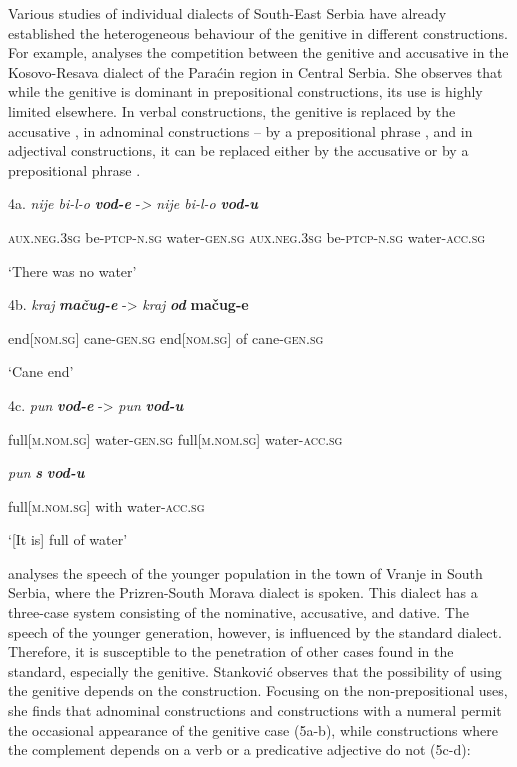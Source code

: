 \documentclass[output=paper]{langscibook}
\begin{document}
Various studies of individual dialects of South-East Serbia have already established the heterogeneous behaviour of the genitive in different constructions. For example, \citet{Miloradović2003} analyses the competition between the genitive and accusative in the Kosovo-Resava dialect of the Paraćin region in Central Serbia. She observes that while the genitive is dominant in prepositional constructions, its use is highly limited elsewhere. In verbal constructions, the genitive is replaced by the accusative , in adnominal constructions – by a prepositional phrase , and in adjectival constructions, it can be replaced either by the accusative or by a prepositional phrase .

4a.   \textit{nije        bi-l-o} \textbf{\textit{vod-e}} {}-\textit{>  nije           bi-l-o} \textbf{\textit{vod-u}}

 \textsc{aux.neg.3sg}   be-\textsc{ptcp-n.sg}   water-\textsc{gen.sg}             \textsc{aux.neg.3sg}  be-\textsc{ptcp-n.sg}  water-\textsc{acc.sg}

         ‘There was no water’

4b.    \textit{kraj} \textbf{\textit{mačug-e}} {}->         \textit{kraj} \textbf{\textit{od}} \textbf{  \textbf{mačug-e}}

         end\textsc{[nom.sg]}       cane-\textsc{gen.sg}  end[\textsc{nom.sg}]        of        cane-\textsc{gen.sg}

         ‘Cane end’

4c.    \textit{pun} \textbf{\textit{vod-e} } {}->         \textit{pun}                  \textbf{\textit{vod-u}}

   full[\textsc{m.nom.sg}]  water-\textsc{gen.sg}  full[\textsc{m.nom.sg]}    water-\textsc{acc.sg}

      \textit{pun} \textbf{\textit{s}} \textbf{\textit{vod-u}}

 full[\textsc{m.nom.sg]}  with  water-\textsc{acc.sg}

‘[It is] full of water’

\citet{Stanković2022} analyses the speech of the younger population in the town of Vranje in South Serbia, where the Prizren-South Morava dialect is spoken. This dialect has a three-case system consisting of the nominative, accusative, and dative. The speech of the younger generation, however, is influenced by the standard dialect. Therefore, it is susceptible to the penetration of other cases found in the standard, especially the genitive. Stanković observes that the possibility of using the genitive depends on the construction. Focusing on the non-prepositional uses, she finds that adnominal constructions and constructions with a numeral permit the occasional appearance of the genitive case (5a-b), while constructions where the complement depends on a verb or a predicative adjective do not (5c-d):
\end{document}

